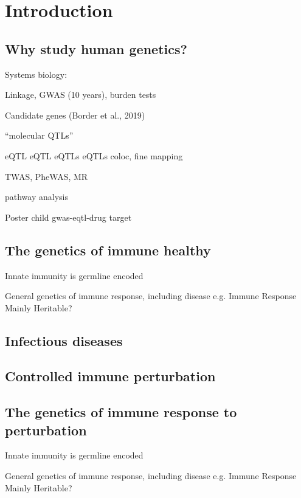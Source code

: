 %
%

\chapter{Introduction}

\section{Why study human genetics?}

Systems biology:

Linkage, GWAS (10 years), burden tests

Candidate genes (Border et al., 2019)

\enquote{molecular QTLs}

\gls{eQTL}
\gls{eQTL}
\glspl{eQTL}
\Glspl{eQTL}
%
coloc, fine mapping

TWAS, PheWAS\autocite{verma2017CurrentScopeChallenges}, MR

pathway analysis

Poster child gwas-eqtl-drug target

\section{The genetics of immune healthy}

Innate immunity is germline encoded

General genetics of immune response, including disease e.g. Immune Response Mainly Heritable? 

\section{Infectious diseases}

\section{Controlled immune perturbation}

\section{The genetics of immune response to perturbation}

Innate immunity is germline encoded

General genetics of immune response, including disease e.g. Immune Response Mainly Heritable? 

